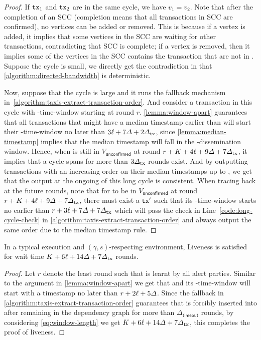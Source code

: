 \begin{proof}
    If $\mathtt{tx}_1$ and $\mathtt{tx}_2$ are in the same cycle, we have $v_1 = v_2$.
    Note that after the completion of an SCC (completion means that all transactions in SCC are confirmed), no vertices can be added or removed.
    This is because if a vertex is added, it implies that some vertices in the SCC are waiting for other transactions, contradicting that SCC is complete; if a vertex is removed, then it implies some of the vertices in the SCC contains the transaction that are not in \txpool.
    Suppose the cycle is small, we directly get the contradiction in that \cref{algorithm:directed-bandwidth} is deterministic.

    Now, suppose that the cycle is large and it runs the fallback mechanism in~\cref{algorithm:taxis-extract-transaction-order}.
    And consider a transaction \tx in this cycle with \PBWindowLen-time-window starting at round $r$.
    \cref{lemma:window-apart} guarantees that all transactions that might have a median timestamp earlier than \tx will start their \PBWindowLen-time-window no later than $3\ell + 7\varDelta + 2\varDelta_{\mathrm{tx}}$, since \cref{lemma:median-timestamp} implies that the median timestamp will fall in the \txDelay-dissemination window.
    Hence, when \tx is still in $V_{\mathsf{unconfirmed}}$ at round $r + K + 4\ell + 9\varDelta + 7\varDelta_{\mathrm{tx}}$, it implies that a cycle spans for more than $3\varDelta_{\mathrm{tx}}$ rounds exist.
    And by outputting transactions with an increasing order on their median timestamps up to \tx, we get that the output at the ongoing of this long cycle is consistent.
    When tracing back at the future rounds, note that for \tx to be in $V_{\mathsf{unconfirmed}}$ at round $r + K + 4\ell + 9\varDelta + 7\varDelta_{\mathrm{tx}}$, there must exist a $\mathtt{tx}'$ such that its \PBWindowLen-time-window starts no earlier than $r + 3\ell + 7\varDelta + 7\varDelta_{\mathrm{tx}}$ which will pass the check in Line~\ref{code:long-cycle-check} in \cref{algorithm:taxis-extract-transaction-order} and always output the same order due to the median timestamp rule.
\end{proof}

\begin{theorem}[Liveness] \label{thm:liveness}
    In a typical execution and $(\gamma, s)$-respecting environment, Liveness is satisfied for wait time $K + 6\ell + 14\varDelta + 7\varDelta_{\mathrm{tx}}$ rounds.
\end{theorem}

\begin{proof}
    Let $r$ denote the least round such that \tx is learnt by all alert parties.
    Similar to the argument in \cref{lemma:window-apart} we get that \tx and its \PBWindowLen-time-window will start with a timestamp no later than $r + 2\ell + 5\varDelta$.
    Since the fallback in \cref{algorithm:taxis-extract-transaction-order} guarantees that \tx is forcibly inserted into \ledger after remaining in the dependency graph for more than $\varDelta_{\mathsf{timeout}}$ rounds, by considering \cref{eq:window-length} we get $K + 6\ell + 14\varDelta + 7\varDelta_{\mathrm{tx}}$, this completes the proof of liveness.
\end{proof}

